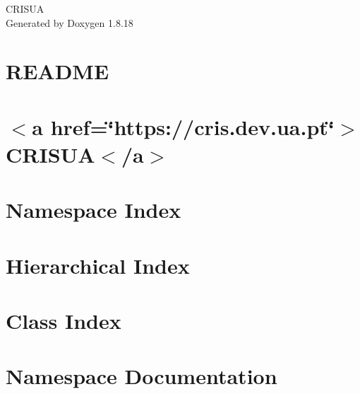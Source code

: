 \let\mypdfximage\pdfximage\def\pdfximage{\immediate\mypdfximage}\documentclass[twoside]{book}
\newcommand{\+}{\discretionary{\mbox{\scriptsize$\hookleftarrow$}}{}{}}
\newcommand{\clearemptydoublepage}{%
  \newpage{\pagestyle{empty}\cleardoublepage}%
}
\begin{document}
\hypersetup{pageanchor=false,
             bookmarksnumbered=true,
             pdfencoding=unicode
            }
\begin{titlepage}
\vspace*{7cm}
\begin{center}%
{\Large C\+R\+I\+S\+UA }\\
\vspace*{1cm}
{\large Generated by Doxygen 1.8.18}\\
\end{center}
\end{titlepage}
\clearemptydoublepage
{}
\tableofcontents
\clearemptydoublepage
{}
\hypersetup{pageanchor=true}

\chapter{R\+E\+A\+D\+ME}
\label{md__c_1__users_pmate__documents__c_r_i_s_u_a__m_v_c-2020-_templates__r_e_a_d_m_e}

\chapter{$<$a href=\char`\"{}https\+://cris.\+dev.\+ua.\+pt\char`\"{}$>$C\+R\+I\+S\+UA$<$/a$>$}
\label{md__c_1__users_pmate__documents__c_r_i_s_u_a__r_e_a_d_m_e}

\chapter{Namespace Index}

\chapter{Hierarchical Index}

\chapter{Class Index}

\chapter{Namespace Documentation}














\end{document}
